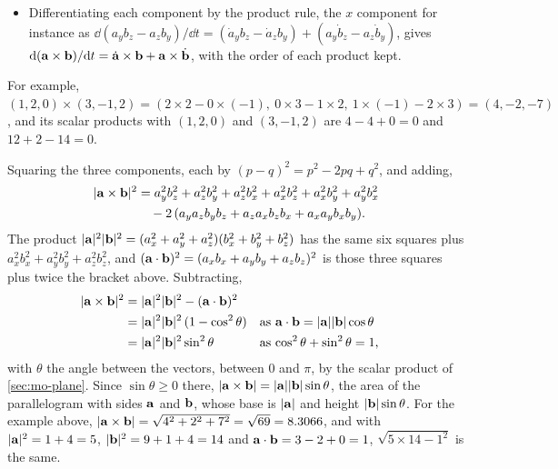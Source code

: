 \begin{toolbox}
\begin{itemize}
   less than half a turn anticlockwise from $\vb{a}$. So the same
   right-hand rule, fingers curling from $\vb{a}$ towards $\vb{b}$, gives
   the direction of $\vb{a}\times\vb{b}$ (\cref{fig:ro-cross}); for vectors
   in any other plane we take it on trust, since turning the axes to bring
   them into the $xy$ plane needs more than we have shown.
\item Differentiating each component by the product rule, the $x$
   component for instance as $\dd(a_yb_z - a_zb_y)/\dd t = (\dot a_yb_z -
   \dot a_zb_y) + (a_y\dot b_z - a_z\dot b_y)$, gives $\mathrm{d}(\bm{\mathrm{a}}\times
   \bm{\mathrm{b}})/\mathrm{d} t = \dot{\bm{\mathrm{a}}}\times\bm{\mathrm{b}} + \bm{\mathrm{a}}\times\dot{\bm{\mathrm{b}}}$,
   with the order of each product kept.
\end{itemize}
For example, $(1, 2, 0)\times(3, -1, 2) = (2\times2 - 0\times(-1),\
0\times3 - 1\times2,\ 1\times(-1) - 2\times3) = (4, -2, -7)$, and its
scalar products with $(1, 2, 0)$ and $(3, -1, 2)$ are $4 - 4 + 0 = 0$ and
$12 + 2 - 14 = 0$.
\end{toolbox}

\begin{toolbox}
Squaring the three components, each by $(p - q)^2 = p^2 - 2pq + q^2$, and
adding,
\begin{align*}
   \lvert\bm{\mathrm{a}}\times\bm{\mathrm{b}}\rvert^2 &= a_y^2b_z^2 + a_z^2b_y^2 + a_z^2b_x^2
   + a_x^2b_z^2 + a_x^2b_y^2 + a_y^2b_x^2\\
   &\quad - 2\,(a_ya_zb_yb_z + a_za_xb_zb_x + a_xa_yb_xb_y) .
\end{align*}
The product $\lvert\bm{\mathrm{a}}\rvert^2\lvert\bm{\mathrm{b}}\rvert^2 = (a_x^2 + a_y^2 +
a_z^2)(b_x^2 + b_y^2 + b_z^2)$ has the same six squares plus $a_x^2b_x^2
+ a_y^2b_y^2 + a_z^2b_z^2$, and $(\bm{\mathrm{a}}\cdot\bm{\mathrm{b}})^2 = (a_xb_x + a_yb_y
+ a_zb_z)^2$ is those three squares plus twice the bracket above.
Subtracting,
\begin{align*}
   \lvert\bm{\mathrm{a}}\times\bm{\mathrm{b}}\rvert^2
   &= \lvert\bm{\mathrm{a}}\rvert^2\lvert\bm{\mathrm{b}}\rvert^2 - (\bm{\mathrm{a}}\cdot\bm{\mathrm{b}})^2\\
   &= \lvert\bm{\mathrm{a}}\rvert^2\lvert\bm{\mathrm{b}}\rvert^2\,(1 - \cos^2\theta)
      && \text{as $\bm{\mathrm{a}}\cdot\bm{\mathrm{b}} = \lvert\bm{\mathrm{a}}\rvert\lvert\bm{\mathrm{b}}\rvert
         \cos\theta$}\\
   &= \lvert\bm{\mathrm{a}}\rvert^2\lvert\bm{\mathrm{b}}\rvert^2\sin^2\theta
      && \text{as $\cos^2\theta + \sin^2\theta = 1$,}
\end{align*}
with $\theta$ the angle between the vectors, between 0 and $\pi$, by the
scalar product of \cref{sec:mo-plane}. Since $\sin\theta \ge 0$ there,
$\lvert\bm{\mathrm{a}}\times\bm{\mathrm{b}}\rvert = \lvert\bm{\mathrm{a}}\rvert\lvert\bm{\mathrm{b}}\rvert
\sin\theta$, the area of the parallelogram with sides $\vb{a}$ and
$\vb{b}$, whose base is $\lvert\bm{\mathrm{a}}\rvert$ and height $\lvert\bm{\mathrm{b}}\rvert
\sin\theta$. For the example above, $\lvert\bm{\mathrm{a}}\times\bm{\mathrm{b}}\rvert = \sqrt{4^2 + 2^2 +
7^2} = \sqrt{69} = 8.3066$, and with $\lvert\bm{\mathrm{a}}\rvert^2 = 1 + 4 = 5$,
$\lvert\bm{\mathrm{b}}\rvert^2 = 9 + 1 + 4 = 14$ and $\bm{\mathrm{a}}\cdot\bm{\mathrm{b}} = 3 - 2 + 0
= 1$, $\sqrt{5\times14 - 1^2}$ is the same.
\end{toolbox}

